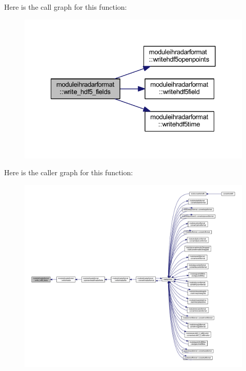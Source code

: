 Here is the call graph for this function\+:\nopagebreak
\begin{figure}[H]
\begin{center}
\leavevmode
\includegraphics[width=328pt]{namespacemoduleihradarformat_ad98c4a786bbe9735cd7eb3b391ad9adb_cgraph}
\end{center}
\end{figure}
Here is the caller graph for this function\+:\nopagebreak
\begin{figure}[H]
\begin{center}
\leavevmode
\includegraphics[width=350pt]{namespacemoduleihradarformat_ad98c4a786bbe9735cd7eb3b391ad9adb_icgraph}
\end{center}
\end{figure}
\mbox{\label{namespacemoduleihradarformat_a77312b34323d0e8aa7466fdfc0f8a35e}} 
